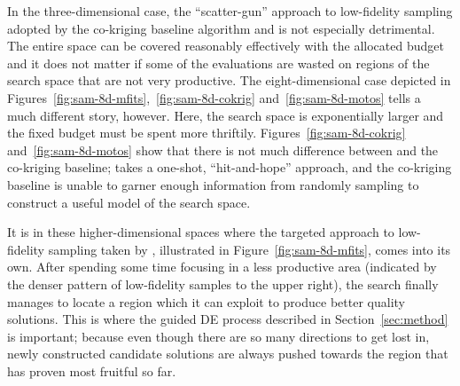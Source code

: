 In the three-dimensional case, the ``scatter-gun'' approach to low-fidelity sampling adopted by the co-kriging baseline algorithm and \motos{} is not especially detrimental. The entire space can be covered reasonably effectively with the allocated budget and it does not matter if some of the evaluations are wasted on regions of the search space that are not very productive. The eight-dimensional case depicted in Figures~\ref{fig:sam-8d-mfits},~\ref{fig:sam-8d-cokrig} and~\ref{fig:sam-8d-motos} tells a much different story, however. Here, the search space is exponentially larger and the fixed budget must be spent more thriftily. Figures~\ref{fig:sam-8d-cokrig} and~\ref{fig:sam-8d-motos} show that there is not much difference between \motos{} and the co-kriging baseline; \motos{} takes a one-shot, ``hit-and-hope'' approach, and the co-kriging baseline is unable to garner enough information from randomly sampling to construct a useful model of the search space. 

It is in these higher-dimensional spaces where the targeted approach to low-fidelity sampling taken by \AlgName{}, illustrated in Figure~\ref{fig:sam-8d-mfits}, comes into its own. After spending some time focusing in a less productive area (indicated by the denser pattern of low-fidelity samples to the upper right), the search finally manages to locate a region which it can exploit to produce better quality solutions. This is where the guided DE process described in Section~\ref{sec:method} is important; because even though there are so many directions to get lost in, newly constructed candidate solutions are always pushed towards the region that has proven most fruitful so far.

